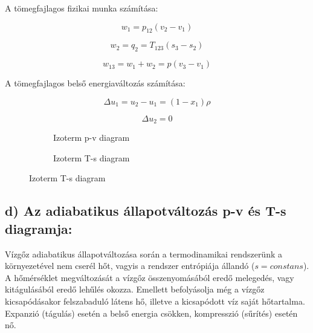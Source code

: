 A tömegfajlagos fizikai munka számítása:

\begin{equation*}
w_1 = p_{12}(v_2-v_1)
\end{equation*}

\begin{equation*}
w_2 = q_2 = T_{123}(s_3-s_2) 
\end{equation*}

\begin{equation*}
w_{13} = w_1+w_2 = p(v_3-v_1)
\end{equation*}

A tömegfajlagos belső energiaváltozás számítása:

\begin{equation*}
\Delta u_1 = u_2-u_1 = (1-x_1)\rho
\end{equation*}

\begin{equation*}
\Delta u_2 =0
\end{equation*}


\begin{figure}[h]
	\centering
	\begin{subfigure}[b]{0.545\textwidth} 
		\centering
		\begin{tikzpicture}
		
		
		
		\end{tikzpicture}
		\caption{Izoterm p-v diagram}
		
	\end{subfigure}
	\begin{subfigure}[b]{0.435\textwidth}
		\centering
		\begin{tikzpicture}
		
		
		
		\end{tikzpicture}
		\caption{Izoterm T-s diagram}
		
	\end{subfigure}
\end{figure}

\pagebreak

\subsection*{d) Az adiabatikus állapotváltozás p-v és T-s diagramja:}

Vízgőz adiabatikus állapotváltozása során a termodinamikai rendszerünk a környezetével nem cserél hőt, vagyis a rendszer entrópiája állandó ($s=constans$). A hőmérséklet megváltozását a vízgőz összenyomásából eredő melegedés, vagy kitágulásából eredő lehűlés okozza. Emellett befolyásolja még a vízgőz kicsapódásakor felszabaduló látens hő, illetve a kicsapódott víz saját hőtartalma. Expanzió (tágulás) esetén a belső energia csökken, kompresszió (sűrítés) esetén nő.

